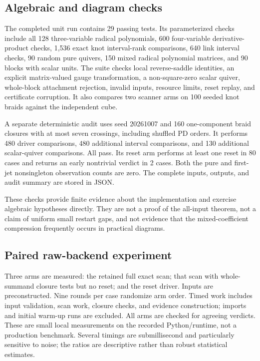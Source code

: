 \documentclass[11pt]{article}
\theoremstyle{definition}\newtheorem{definition}[theorem]{Definition}\newtheorem{example}[theorem]{Example}
\theoremstyle{remark}\newtheorem{remark}[theorem]{Remark}
\newcommand{\AuditQuivers}{130}
\newcommand{\AuditResets}{80}
\newcommand{\AuditEarly}{2}
\begin{document}
\subsection{Algebraic and diagram checks}
The completed unit run contains 29 passing tests. Its parameterized checks include all 128 three-variable radical polynomials, 600 four-variable derivative-product checks, 1,536 exact knot interval-rank comparisons, 640 link interval checks, 90 random pure quivers, 150 mixed radical polynomial matrices, and 90 blocks with scalar units. The suite checks local reverse-saddle identities, an explicit matrix-valued gauge transformation, a non-square-zero scalar quiver, whole-block attachment rejection, invalid inputs, resource limits, reset replay, and certificate corruption. It also compares two scanner arms on 100 seeded knot braids against the independent cube.

A separate deterministic audit uses seed 20261007 and 160 one-component braid closures with at most seven crossings, including shuffled PD orders. It performs 480 driver comparisons, 480 additional interval comparisons, and \AuditQuivers{} additional scalar-quiver comparisons. All pass. Its reset arm performs at least one reset in \AuditResets{} cases and returns an early nontrivial verdict in \AuditEarly{} cases. Both the pure and first-jet nonsingleton observation counts are zero. The complete inputs, outputs, and audit summary are stored in JSON.

These checks provide finite evidence about the implementation and exercise algebraic hypotheses directly. They are not a proof of the all-input theorem, not a claim of uniform small restart gaps, and not evidence that the mixed-coefficient compression frequently occurs in practical diagrams.

\subsection{Paired raw-backend experiment}
Three arms are measured: the retained full exact scan; that scan with whole-summand closure tests but no reset; and the reset driver. Inputs are preconstructed. Nine rounds per case randomize arm order. Timed work includes input validation, scan work, closure checks, and evidence construction; imports and initial warm-up runs are excluded. All arms are checked for agreeing verdicts. These are small local measurements on the recorded Python/runtime, not a production benchmark. Several timings are submillisecond and particularly sensitive to noise; the ratios are descriptive rather than robust statistical estimates.
\end{document}
